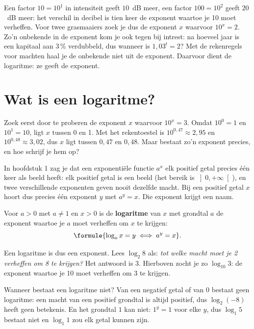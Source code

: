Een factor $10 = 10^1$ in intensiteit geeft $10$~dB meer, een factor $100 = 10^2$ geeft $20$~dB meer: het verschil in decibel is tien keer de exponent waartoe je 10 moet verheffen. Voor twee grasmaaiers zoek je dus de exponent $x$ waarvoor $10^x = 2$. Zo'n onbekende in de exponent kom je ook tegen bij intrest: na hoeveel jaar is een kapitaal aan $3$\,\% verdubbeld, dus wanneer is $1{,}03^t = 2$? Met de rekenregels voor machten haal je de onbekende niet uit de exponent. Daarvoor dient de logaritme: ze geeft de exponent.

\begin{oefeningen}[Start]

\end{oefeningen}

\section{Wat is een logaritme?}

Zoek eerst door te proberen de exponent $x$ waarvoor $10^x = 3$. Omdat $10^0 = 1$ en $10^1 = 10$, ligt $x$ tussen 0 en 1. Met het rekentoestel is $10^{0{,}47} \approx 2{,}95$ en $10^{0{,}48} \approx 3{,}02$, dus $x$ ligt tussen $0{,}47$ en $0{,}48$. Maar bestaat zo'n exponent precies, en hoe schrijf je hem op?

In hoofdstuk 1 zag je dat een exponentiële functie $a^x$ elk positief getal precies één keer als beeld heeft: elk positief getal is een beeld (het bereik is $\left]0, +\infty\right[$), en twee verschillende exponenten geven nooit dezelfde macht. Bij een positief getal $x$ hoort dus precies één exponent $y$ met $a^y = x$. Die exponent krijgt een naam.

\begin{theorie}
Voor $a > 0$ met $a \neq 1$ en $x > 0$ is de \textbf{\textcolor{accent}{logaritme}} van $x$ met grondtal $a$ de exponent waartoe je $a$ moet verheffen om $x$ te krijgen:
\[\formule{\log_a x = y \iff a^y = x}.\]
\end{theorie}

Een logaritme is dus een exponent. Lees $\log_2 8$ als: \textit{tot welke macht moet je 2 verheffen om 8 te krijgen?} Het antwoord is 3. Hierboven zocht je zo $\log_{10} 3$: de exponent waartoe je 10 moet verheffen om 3 te krijgen.

Wanneer bestaat een logaritme niet? Van een negatief getal of van $0$ bestaat geen logaritme: een macht van een positief grondtal is altijd positief, dus $\log_2(-8)$ heeft geen betekenis. En het grondtal $1$ kan niet: $1^y = 1$ voor elke $y$, dus $\log_1 5$ bestaat niet en $\log_1 1$ zou elk getal kunnen zijn.

